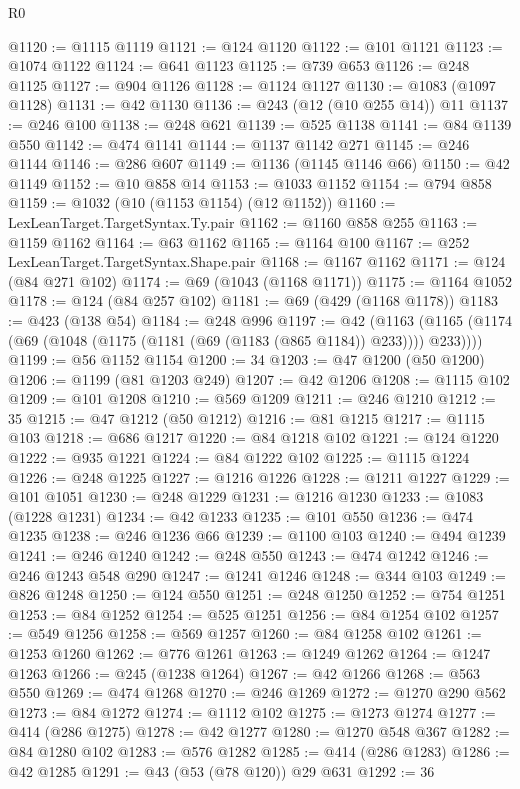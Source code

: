 \begin{lexlean}{R0}
\begin{coremodule}
@1120 := @1115 @1119
@1121 := @124 @1120
@1122 := @101 @1121
@1123 := @1074 @1122
@1124 := @641 @1123
@1125 := @739 @653
@1126 := @248 @1125
@1127 := @904 @1126
@1128 := @1124 @1127
@1130 := @1083 (@1097 @1128)
@1131 := @42 @1130
@1136 := @243 (@12 (@10 @255 @14)) @11
@1137 := @246 @100
@1138 := @248 @621
@1139 := @525 @1138
@1141 := @84 @1139 @550
@1142 := @474 @1141
@1144 := @1137 @1142 @271
@1145 := @246 @1144
@1146 := @286 @607
@1149 := @1136 (@1145 @1146 @66)
@1150 := @42 @1149
@1152 := @10 @858 @14
@1153 := @1033 @1152
@1154 := @794 @858
@1159 := @1032 (@10 (@1153 @1154) (@12 @1152))
@1160 := LexLeanTarget.TargetSyntax.Ty.pair
@1162 := @1160 @858 @255
@1163 := @1159 @1162
@1164 := @63 @1162
@1165 := @1164 @100
@1167 := @252 LexLeanTarget.TargetSyntax.Shape.pair
@1168 := @1167 @1162
@1171 := @124 (@84 @271 @102)
@1174 := @69 (@1043 (@1168 @1171))
@1175 := @1164 @1052
@1178 := @124 (@84 @257 @102)
@1181 := @69 (@429 (@1168 @1178))
@1183 := @423 (@138 @54)
@1184 := @248 @996
@1197 := @42
    (@1163 (@1165 (@1174 (@69 (@1048 (@1175 (@1181 (@69 (@1183 (@865 @1184)) @233)))) @233))))
@1199 := @56 @1152 @1154
@1200 := 34
@1203 := @47 @1200 (@50 @1200)
@1206 := @1199 (@81 @1203 @249)
@1207 := @42 @1206
@1208 := @1115 @102
@1209 := @101 @1208
@1210 := @569 @1209
@1211 := @246 @1210
@1212 := 35
@1215 := @47 @1212 (@50 @1212)
@1216 := @81 @1215
@1217 := @1115 @103
@1218 := @686 @1217
@1220 := @84 @1218 @102
@1221 := @124 @1220
@1222 := @935 @1221
@1224 := @84 @1222 @102
@1225 := @1115 @1224
@1226 := @248 @1225
@1227 := @1216 @1226
@1228 := @1211 @1227
@1229 := @101 @1051
@1230 := @248 @1229
@1231 := @1216 @1230
@1233 := @1083 (@1228 @1231)
@1234 := @42 @1233
@1235 := @101 @550
@1236 := @474 @1235
@1238 := @246 @1236 @66
@1239 := @1100 @103
@1240 := @494 @1239
@1241 := @246 @1240
@1242 := @248 @550
@1243 := @474 @1242
@1246 := @246 @1243 @548 @290
@1247 := @1241 @1246
@1248 := @344 @103
@1249 := @826 @1248
@1250 := @124 @550
@1251 := @248 @1250
@1252 := @754 @1251
@1253 := @84 @1252
@1254 := @525 @1251
@1256 := @84 @1254 @102
@1257 := @549 @1256
@1258 := @569 @1257
@1260 := @84 @1258 @102
@1261 := @1253 @1260
@1262 := @776 @1261
@1263 := @1249 @1262
@1264 := @1247 @1263
@1266 := @245 (@1238 @1264)
@1267 := @42 @1266
@1268 := @563 @550
@1269 := @474 @1268
@1270 := @246 @1269
@1272 := @1270 @290 @562
@1273 := @84 @1272
@1274 := @1112 @102
@1275 := @1273 @1274
@1277 := @414 (@286 @1275)
@1278 := @42 @1277
@1280 := @1270 @548 @367
@1282 := @84 @1280 @102
@1283 := @576 @1282
@1285 := @414 (@286 @1283)
@1286 := @42 @1285
@1291 := @43 (@53 (@78 @120)) @29 @631
@1292 := 36

\end{coremodule}
\end{lexlean}

